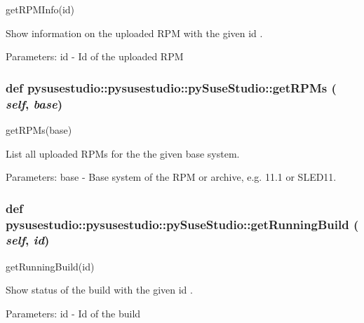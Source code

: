 \label{classpysusestudio_1_1pysusestudio_1_1py_suse_studio_ae469f2a986932d4851947bb747522eaa}
\begin{DoxyVerb}getRPMInfo(id)

       Show information on the uploaded RPM with the given id .
        
            Parameters:
id - Id of the uploaded RPM

\end{DoxyVerb}
 \hypertarget{classpysusestudio_1_1pysusestudio_1_1py_suse_studio_a01f7a5eddea127de6a8c31bf6d6d90c5}{
\subsubsection[{getRPMs}]{\setlength{\rightskip}{0pt plus 5cm}def pysusestudio::pysusestudio::pySuseStudio::getRPMs ( {\em self}, \/   {\em base})}}
\label{classpysusestudio_1_1pysusestudio_1_1py_suse_studio_a01f7a5eddea127de6a8c31bf6d6d90c5}
\begin{DoxyVerb}getRPMs(base)

        List all uploaded RPMs for the the given base system.
        
            Parameters:
base - Base system of the RPM or archive, e.g. 11.1 or SLED11.

\end{DoxyVerb}
 \hypertarget{classpysusestudio_1_1pysusestudio_1_1py_suse_studio_a0aafd511f3d7a753b21c26718c9797fe}{
\subsubsection[{getRunningBuild}]{\setlength{\rightskip}{0pt plus 5cm}def pysusestudio::pysusestudio::pySuseStudio::getRunningBuild ( {\em self}, \/   {\em id})}}
\label{classpysusestudio_1_1pysusestudio_1_1py_suse_studio_a0aafd511f3d7a753b21c26718c9797fe}
\begin{DoxyVerb}getRunningBuild(id)

       Show status of the build with the given id .
        
            Parameters:
id - Id of the build

\end{DoxyVerb}
